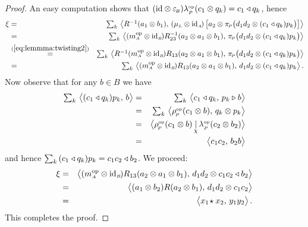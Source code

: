 \begin{proof}
An easy computation shows that $(\mbox{\rm id} \otimes \varepsilon_{\scriptscriptstyle \! B})\lambda^{\scriptscriptstyle \rm op}_{_P\!}(c_1 \otimes q_k) = c_1 \triangleleft q_k$,
hence
\begin{eqnarray*}
\xi &=& \textstyle \sum_k \,
    \pairM{R^{-1}(a_1 \tens b_1)}{(\muL\tens \idA)
             \left[ a_2 \tens \piP \!
                     \left(d_1 d_2 \tens (c_1 \ract q_k)p_k\vertM\right)
                  \right]}
\\ &=& \textstyle \sum_k \,
    \pairM{(\mult{A}\op \tens \idB)R^{-1}_{23}(a_2 \tens a_1 \tens b_1)}{
               \piP \! \left(d_1 d_2 \tens (c_1 \ract q_k)p_k\vertM\right)}
\\&\stackrel{(\ref{eq:lemmma:twisting2})}{=}& \textstyle \sum_k \,
  \pairM{R^{-1}(\mult{A}\op \tens \idB)R_{13}(a_2 \tens a_1 \tens b_1)}{
               \piP \! \left(d_1 d_2 \tens (c_1 \ract q_k)p_k\vertM\right)}
\\ &=& \textstyle \sum_k \,
  \pairM{(\mult{A}\op \tens \idB)R_{13}(a_2 \tens a_1 \tens b_1)}{
               d_1 d_2 \tens (c_1 \ract q_k)p_k}.
\end{eqnarray*}
Now observe that for any $b\in B$ we have
\begin{eqnarray*}
\textstyle \sum_k \,\pairM{(c_1 \ract q_k)p_k}{b}
&=&
\textstyle \sum_k \,\pairM{c_1 \ract q_k}{p_k \lact b}
\\&=&
\textstyle \sum_k \,\pairM{\rpop(c_1 \tens b)}{q_{k} \tens p_{k}}
\\&=&
\pairflipM{\rpop(c_1 \tens b)}{\lpop(c_2 \tens b_2)}
\\&=&
\pairM{c_1 c_2}{b_2 b}
\end{eqnarray*}
and hence $\sum_k \,(c_1 \triangleleft q_k)p_k = c_1 c_2 \triangleleft b_2$. We proceed:
\begin{eqnarray*}
\xi &=&
\pairM{(\mult{A}\op \tens \idB)R_{13}(a_2 \tens a_1 \tens b_1)}{
               d_1 d_2 \tens c_1 c_2 \ract b_2}
\\&=&
\pairM{(a_1 \tens b_2) R(a_2 \tens b_1)}{d_1 d_2 \tens c_1 c_2}
\\&=&
\pairM{x_1 \! \star x_2}{y_1 y_2}.
\end{eqnarray*}
This completes the proof.
\end{proof}
